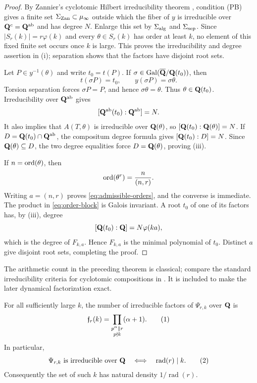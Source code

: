 \begin{proof}
By Zannier's cyclotomic Hilbert irreducibility theorem
\cite[Theorem 2.1]{Zannier2010}, condition (PB) gives a finite set
$\Sigma_{\rm Zan}\subset\mu_\infty$ outside which the fiber of $y$ is
irreducible over $\mathbf Q^c=\mathbf Q^{\mathrm{ab}}$ and has degree $N$.  Enlarge
this set by $\Sigma_{\rm alg}$ and $\Sigma_{\rm sep}$.  Since
$|S_r(k)|=r\varphi(k)$ and every $\theta\in S_r(k)$ has order at least
$k$, no element of this fixed finite set occurs once $k$ is large.
This proves the irreducibility and degree assertion in (i); separation
shows that the factors have disjoint root sets.

Let $P\in y^{-1}(\theta)$ and write $t_0=t(P)$.  If
$\sigma\in\operatorname{Gal}(\overline{\mathbf Q}/\mathbf Q(t_0))$, then
\[
 t(\sigma P)=t_0,\qquad y(\sigma P)=\sigma\theta.
\]
Torsion separation forces $\sigma P=P$, and hence
$\sigma\theta=\theta$.  Thus $\theta\in\mathbf Q(t_0)$.  Irreducibility over
$\mathbf Q^{\mathrm{ab}}$ gives
\[
 [\mathbf Q^{\mathrm{ab}}(t_0):\mathbf Q^{\mathrm{ab}}]=N.
\]
It also implies that $A(T,\theta)$ is irreducible over $\mathbf Q(\theta)$,
so $[\mathbf Q(t_0):\mathbf Q(\theta)]=N$.  If
$D=\mathbf Q(t_0)\cap\mathbf Q^{\mathrm{ab}}$, the compositum degree formula gives
$[\mathbf Q(t_0):D]=N$.  Since $\mathbf Q(\theta)\subseteq D$, the two degree
equalities force $D=\mathbf Q(\theta)$, proving (iii).

If $n=\operatorname{ord}(\theta)$, then
\[
 \operatorname{ord}(\theta^r)=\frac{n}{(n,r)}.
\]
Writing $a=(n,r)$ proves \eqref{eq:admissible-orders}, and the converse
is immediate.  The product in \eqref{eq:order-block} is Galois
invariant.  A root $t_0$ of one of its factors has, by (iii), degree
\[
 [\mathbf Q(t_0):\mathbf Q]=N\varphi(ka),
\]
which is the degree of $F_{k,a}$.  Hence $F_{k,a}$ is the minimal
polynomial of $t_0$.  Distinct $a$ give disjoint root sets, completing
the proof.
\end{proof}

The arithmetic count in the preceding theorem is classical; compare
the standard irreducibility criteria for cyclotomic compositions in
\cite{Damianou2011}.  It is included to make the later dynamical
factorization exact.

\begin{corollary}
\label{cor:abstract-factor-count}
For all sufficiently large $k$, the number of irreducible factors of
$\Psi_{r,k}$ over $\mathbf Q$ is
\[
 \mathfrak f_r(k)=
 \prod_{\substack{p^\alpha\parallel r\\p\nmid k}}(\alpha+1).
 \numberthis\label{eq:factor-count}
\]
In particular,
\[
 \Psi_{r,k}\text{ is irreducible over }\Q
 \quad\Longleftrightarrow\quad
 \operatorname{rad}(r)\mid k.
 \numberthis\label{eq:radical-criterion}
\]
Consequently the set of such $k$ has natural density
$1/\operatorname{rad}(r)$.
\end{corollary}

